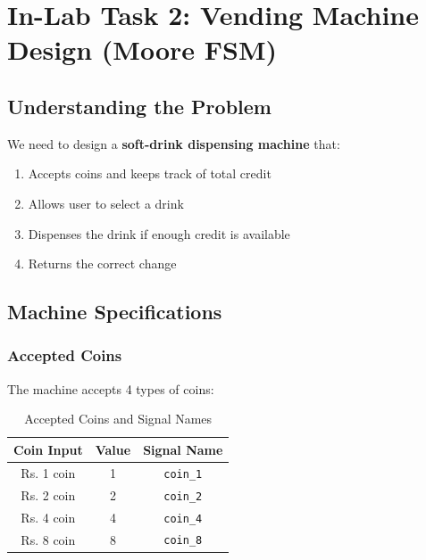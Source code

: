 \documentclass[12pt,a4paper]{article}
\begin{document}
\section{In-Lab Task 2: Vending Machine Design (Moore FSM)}

\subsection{Understanding the Problem}

We need to design a \textbf{soft-drink dispensing machine} that:
\begin{enumerate}
    \item Accepts coins and keeps track of total credit
    \item Allows user to select a drink
    \item Dispenses the drink if enough credit is available
    \item Returns the correct change
\end{enumerate}

\subsection{Machine Specifications}

\subsubsection{Accepted Coins}
The machine accepts 4 types of coins:

\begin{table}[H]
    \centering
    \begin{tabular}{|c|c|c|}
        \hline
        \textbf{Coin Input} & \textbf{Value} & \textbf{Signal Name} \\
        \hline
        Rs. 1 coin & 1 & \texttt{coin\_1} \\
        Rs. 2 coin & 2 & \texttt{coin\_2} \\
        Rs. 4 coin & 4 & \texttt{coin\_4} \\
        Rs. 8 coin & 8 & \texttt{coin\_8} \\
        \hline
    \end{tabular}
    \caption{Accepted Coins and Signal Names}
\end{table}
\end{document}
